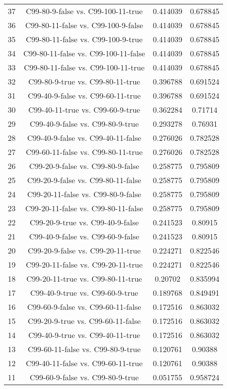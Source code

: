 \documentclass[a4paper,10pt]{article}
\begin{document}
\begin{landscape}
\begin{table}[!htp]
\begin{tabular}{cccc}
37&C99-80-9-false vs. C99-100-11-true&0.414039&0.678845\\
36&C99-80-11-false vs. C99-100-9-false&0.414039&0.678845\\
35&C99-80-11-false vs. C99-100-9-true&0.414039&0.678845\\
34&C99-80-11-false vs. C99-100-11-false&0.414039&0.678845\\
33&C99-80-11-false vs. C99-100-11-true&0.414039&0.678845\\
32&C99-80-9-true vs. C99-80-11-true&0.396788&0.691524\\
31&C99-40-9-false vs. C99-60-11-true&0.396788&0.691524\\
30&C99-40-11-true vs. C99-60-9-true&0.362284&0.71714\\
29&C99-40-9-false vs. C99-80-9-true&0.293278&0.76931\\
28&C99-40-9-false vs. C99-40-11-false&0.276026&0.782528\\
27&C99-60-11-false vs. C99-80-11-true&0.276026&0.782528\\
26&C99-20-9-false vs. C99-80-9-false&0.258775&0.795809\\
25&C99-20-9-false vs. C99-80-11-false&0.258775&0.795809\\
24&C99-20-11-false vs. C99-80-9-false&0.258775&0.795809\\
23&C99-20-11-false vs. C99-80-11-false&0.258775&0.795809\\
22&C99-20-9-true vs. C99-40-9-false&0.241523&0.80915\\
21&C99-40-9-false vs. C99-60-9-false&0.241523&0.80915\\
20&C99-20-9-false vs. C99-20-11-true&0.224271&0.822546\\
19&C99-20-11-false vs. C99-20-11-true&0.224271&0.822546\\
18&C99-20-11-true vs. C99-80-11-true&0.20702&0.835994\\
17&C99-40-9-true vs. C99-60-9-true&0.189768&0.849491\\
16&C99-60-9-false vs. C99-60-11-false&0.172516&0.863032\\
15&C99-20-9-true vs. C99-60-11-false&0.172516&0.863032\\
14&C99-40-9-true vs. C99-40-11-true&0.172516&0.863032\\
13&C99-60-11-false vs. C99-80-9-true&0.120761&0.90388\\
12&C99-40-11-false vs. C99-60-11-true&0.120761&0.90388\\
11&C99-60-9-false vs. C99-80-9-true&0.051755&0.958724\\

\end{tabular}
\end{table}
\end{landscape}
\end{document}
